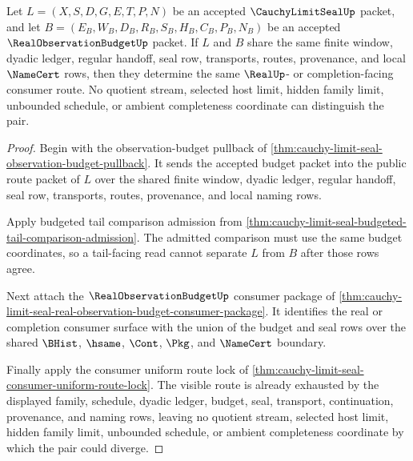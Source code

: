 \begin{theorem}
\label{thm:cauchy-limit-seal-budget-route-pairing-determinacy}
Let $L=(X,S,D,G,E,T,P,N)$ be an accepted $\CauchyLimitSealUp$ packet, and let $B=(E_B,W_B,D_B,R_B,S_B,H_B,C_B,P_B,N_B)$ be an accepted $\RealObservationBudgetUp$ packet. If $L$ and $B$ share the same finite window, dyadic ledger, regular handoff, seal row, transports, routes, provenance, and local $\NameCert$ rows, then they determine the same $\RealUp$- or completion-facing consumer route. No quotient stream, selected host limit, hidden family limit, unbounded schedule, or ambient completeness coordinate can distinguish the pair.
\end{theorem}
\begin{proof}
Begin with the observation-budget pullback of \autoref{thm:cauchy-limit-seal-observation-budget-pullback}. It sends the accepted budget packet into the public route packet of $L$ over the shared finite window, dyadic ledger, regular handoff, seal row, transports, routes, provenance, and local naming rows.

Apply budgeted tail comparison admission from \autoref{thm:cauchy-limit-seal-budgeted-tail-comparison-admission}. The admitted comparison must use the same budget coordinates, so a tail-facing read cannot separate $L$ from $B$ after those rows agree.

Next attach the $\RealObservationBudgetUp$ consumer package of \autoref{thm:cauchy-limit-seal-real-observation-budget-consumer-package}. It identifies the real or completion consumer surface with the union of the budget and seal rows over the shared $\BHist$, $\hsame$, $\Cont$, $\Pkg$, and $\NameCert$ boundary.

Finally apply the consumer uniform route lock of \autoref{thm:cauchy-limit-seal-consumer-uniform-route-lock}. The visible route is already exhausted by the displayed family, schedule, dyadic ledger, budget, seal, transport, continuation, provenance, and naming rows, leaving no quotient stream, selected host limit, hidden family limit, unbounded schedule, or ambient completeness coordinate by which the pair could diverge.
\end{proof}

